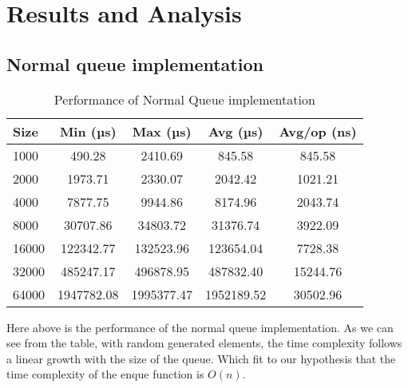 \section*{Results and Analysis}
\subsection*{Normal queue implementation}
\begin{table}[h]
    \centering
    \begin{tabular}{|l|c|c|c|c|}
    \hline
    \textbf{Size} & \textbf{Min (µs)} & \textbf{Max (µs)} & \textbf{Avg (µs)} & \textbf{Avg/op (ns)} \\
    \hline
    1000 & 490.28 & 2410.69 & 845.58 & 845.58 \\
    2000 & 1973.71 & 2330.07 & 2042.42 & 1021.21 \\
    4000 & 7877.75 & 9944.86 & 8174.96 & 2043.74 \\
    8000 & 30707.86 & 34803.72 & 31376.74 & 3922.09 \\
    16000 & 122342.77 & 132523.96 & 123654.04 & 7728.38 \\
    32000 & 485247.17 & 496878.95 & 487832.40 & 15244.76 \\
    64000 & 1947782.08 & 1995377.47 & 1952189.52 & 30502.96 \\
    \hline
    \end{tabular}
    \caption{Performance of Normal Queue implementation}
    \label{tab:queue_perf}
\end{table}
Here above is the performance of the normal queue implementation. As we can see from the table, with random generated elements, the time complexity follows a linear growth with the size of the queue. Which fit to our hypothesis that the time complexity of the enque function is $O(n)$.


